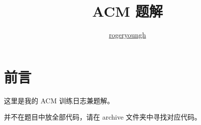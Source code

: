 \documentclass{probook}
\title{ACM 题解}
\author{\href{https://github.com/rogeryoungh}{rogeryoungh}}
\begin{document}
\newcommand\mfrac[2]{\dfrac{#1\smash[b]{\strut}}{#2\smash[t]{\strut}}}
\newcommand{\RR}{\mathbb{R}}
\newcommand{\NN}{\mathbb{N}}
\newcommand{\QQ}{\mathbb{Q}}
\newcommand{\ZZ}{\mathbb{Z}}
\newcommand{\ee}{\mathrm{e}}
\newcommand{\dd}{\mathrm{d}}
\newcommand{\uppi}{\mathrm{\pi}}
\newcommand{\eps}{\varepsilon}

\newcommand{\num}[1]{{\fzfs{（}}{\rm{#1}}{\fzfs{）}}}

\maketitle

\frontmatter

\chapter*{前言}

这里是我的 ACM 训练日志兼题解。

并不在题目中放全部代码，请在 archive 文件夹中寻找对应代码。

\tableofcontents

\mainmatter












\end{document}
